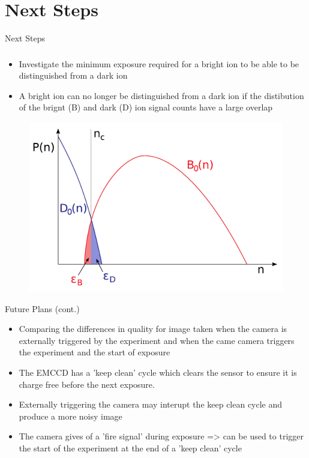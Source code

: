 \documentclass{beamer}
\begin{document}
\section{Next Steps}
\begin{frame}{Next Steps}
\frametitle{}
\begin{itemize}
\item Investigate the minimum exposure required for a bright ion to be able to be distinguished from a dark ion
\bigskip
\item A bright ion can no longer be distinguished from a dark ion if the distibution of the brignt (B) and dark (D) ion signal counts have a large overlap

\end{itemize}

\begin{figure}
\centering
\includegraphics[scale=0.3]{Figures/B_D_graph.png}
\end{figure}

\end{frame}

\begin{frame}{Future Plans (cont.)}

\begin{itemize}
\item Comparing the differences in quality for image taken when the camera is externally triggered by the experiment and when the came camera triggers the experiment and the start of exposure
\bigskip
\item The EMCCD has a 'keep clean' cycle which clears the sensor to ensure it is charge free before the next exposure.
\bigskip
\item Externally triggering the camera may interupt the keep clean cycle and produce a more noisy image
\bigskip
\item The camera gives of a 'fire signal' during exposure => can be used to trigger the start of the experiment at the end of a 'keep clean' cycle
\end{itemize}


\end{frame}
\end{document}
